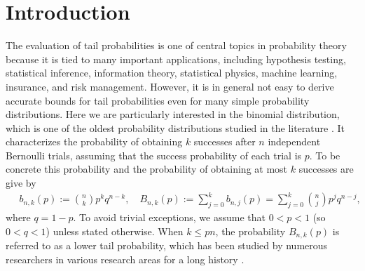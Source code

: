 \documentclass[aop]{imsart}
\theoremstyle{plain}
\theoremstyle{remark}
\newcommand{\1}{\operatorname{\uppercase\expandafter{\romannumeral1}}}
\newcommand{\2}{\operatorname{\uppercase\expandafter{\romannumeral2}}}
\newcommand{\3}{\operatorname{\uppercase\expandafter{\romannumeral3}}}
\newcommand{\4}{\operatorname{\uppercase\expandafter{\romannumeral4}}}
\newcommand{\5}{\operatorname{\uppercase\expandafter{\romannumeral5}}}
\newcommand{\6}{\operatorname{\uppercase\expandafter{\romannumeral6}}}
\newcommand{\7}{\operatorname{\uppercase\expandafter{\romannumeral7}}}
\newcommand{\8}{\operatorname{\uppercase\expandafter{\romannumeral8}}}
\newcommand{\9}{\operatorname{\uppercase\expandafter{\romannumeral9}}}
\begin{document}
\date{\today}
\maketitle

\tableofcontents



\section{Introduction}
The evaluation of tail probabilities is one of central topics in probability theory 
because it is tied to many important applications, including hypothesis testing, statistical  inference, information theory,  statistical physics, machine learning, insurance, and risk management. However, it is in general not easy to derive accurate bounds for tail probabilities even for many simple probability distributions. Here we are particularly interested in the binomial distribution, which is one of the oldest probability distributions studied in the literature \cite{Bern1713book,Moiv1738book,Lapl1812book,Hald03book}. It characterizes the probability of obtaining $k$ successes after $n$ independent Bernoulli trials, assuming that the success probability of each trial is $p$. To be concrete this probability and the probability of obtaining at most $k$ successes are give by
\begin{align}\label{eq:Bnkp}
\quad b_{n,k}(p):= {n \choose k} p^k q^{n-k},\quad B_{n,k}(p):= \sum_{j=0}^k b_{n,j}(p)= \sum_{j=0}^k {n \choose j} p^j 
q^{n-j},
\end{align}
where $q=1-p$. To avoid trivial exceptions, we  assume that  $0<p<1$ (so $0<q<1$) unless stated otherwise. When  $k\leq pn$,
the probability $B_{n,k}(p)$ is referred to as a lower tail probability, which has been studied by numerous researchers in various research areas for a long history \cite{Bern1713book,Moiv1738book,Lapl1812book,Cher52,Hoef63,PeizP68,Litt69,McKa89,Hald03book,MacWS77book,Ash92book, JohnKK05,CsisK11,Csis98,Haya17book}.
\end{document}
